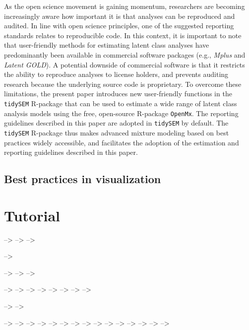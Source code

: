 \documentclass[
  ,man]{apa6}
\begin{document}
As the open science movement is gaining momentum,
researchers are becoming increasingly aware
how important it is that analyses can be reproduced and audited.
In line with open science principles, one of the suggested reporting standards relates to reproducible code.
In this context, it is important to note that user-friendly methods for estimating latent class analyses have predominantly been available in commercial software packages (e.g., \emph{Mplus} and \emph{Latent GOLD}).
A potential downside of commercial software is that it restricts the ability to reproduce analyses to license holders,
and prevents auditing research because the underlying source code is proprietary.
To overcome these limitations, the present paper introduces new user-friendly functions in the \texttt{tidySEM} R-package that can be used to estimate a wide range of latent class analysis models using the free, open-source R-package \texttt{OpenMx}.
The reporting guidelines described in this paper are adopted in \texttt{tidySEM} by default.
The \texttt{tidySEM} R-package thus makes advanced mixture modeling based on best practices widely accessible,
and facilitates the adoption of the estimation and reporting guidelines described in this paper.

\hypertarget{best-practices-in-visualization}{%
\subsection{Best practices in visualization}\label{best-practices-in-visualization}}

\hypertarget{tutorial}{%
\section{Tutorial}\label{tutorial}}

--\textgreater{}
--\textgreater{}
--\textgreater{}

--\textgreater{}

--\textgreater{}
--\textgreater{}
--\textgreater{}

--\textgreater{}
--\textgreater{}
--\textgreater{}
--\textgreater{}
--\textgreater{}
--\textgreater{}
--\textgreater{}
--\textgreater{}

--\textgreater{}
--\textgreater{}

--\textgreater{}
--\textgreater{}
--\textgreater{}
--\textgreater{}
--\textgreater{}
--\textgreater{}
--\textgreater{}
--\textgreater{}
--\textgreater{}
--\textgreater{}
--\textgreater{}
--\textgreater{}
--\textgreater{}
--\textgreater{}
--\textgreater{}
\end{document}
